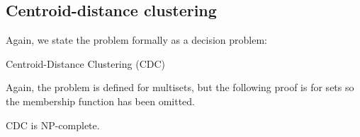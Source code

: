 \subsection{Centroid-distance clustering}
\label{sec:centr-dist-clust}

Again, we state the problem formally as a decision problem:
\begin{problem}{Centroid-Distance Clustering (CDC)}
\end{problem}
Again, the problem is defined for multisets, but the following proof is for
sets so the membership function has been omitted.

\begin{thm}
  \label{thm:CDC-NP}
  CDC is NP-complete.
\end{thm}

